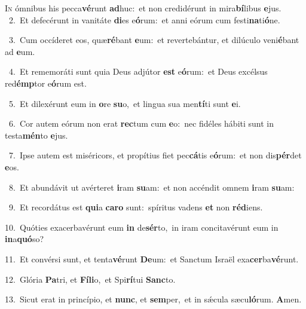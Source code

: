 \lettrine{\initial\textcolor{\initialcolor}{I}}{n} ómnibus his pecca\-\textbf{vé}\-runt \textbf{ad}\-huc:~\star et non credidérunt in mira\-\textbf{bí}\-libus \textbf{e}\-jus.\\
{\numbfont\textcolor{\numbcolor}{~2.}}~Et defecérunt in vanitáte \textbf{di}\-es e\-\textbf{ó}\-rum:~\star et anni eórum cum festi\-\textbf{na}\-ti\-\textbf{ó}\-ne.\par
{\numbfont\textcolor{\numbcolor}{~3.}}~Cum occíderet eos, quæ\-\textbf{ré}\-bant \textbf{e}\-um:~\star et revertebántur, et dilúculo veni\-\textbf{é}\-bant ad \textbf{e}\-um.\par
{\numbfont\textcolor{\numbcolor}{~4.}}~Et rememoráti sunt quia Deus adjútor \textbf{est} e\-\textbf{ó}\-rum:~\star et Deus excélsus red\-\textbf{émp}\-tor e\-\textbf{ó}\-rum est.\par
{\numbfont\textcolor{\numbcolor}{~5.}}~Et dilexérunt eum in \textbf{o}\-re \textbf{su}\-o,~\star et lingua sua men\-\textbf{tí}\-ti sunt \textbf{e}\-i.\par
{\numbfont\textcolor{\numbcolor}{~6.}}~Cor autem eórum non erat \textbf{rec}\-tum cum \textbf{e}\-o:~\star nec fidéles hábiti sunt in testa\-\textbf{mén}\-to \textbf{e}\-jus.\par
{\numbfont\textcolor{\numbcolor}{~7.}}~Ipse autem est miséricors, et propítius fiet pec\-\textbf{cá}\-tis e\-\textbf{ó}\-rum:~\star et non dis\-\textbf{pér}\-det \textbf{e}\-os.\par
{\numbfont\textcolor{\numbcolor}{~8.}}~Et abundávit ut avérteret \textbf{i}\-ram \textbf{su}\-am:~\star et non accéndit omnem \textbf{i}\-ram \textbf{su}\-am:\par
{\numbfont\textcolor{\numbcolor}{~9.}}~Et recordátus est \textbf{qui}\-a \textbf{ca}\-\textbf{ro} sunt:~\star spíritus vadens \textbf{et} non \textbf{réd}\-iens.\par
{\numbfont\textcolor{\numbcolor}{10.}}~Quóties exacerbavérunt eum \textbf{in} de\-\textbf{sér}\-to,~\star in iram concitavérunt eum in \textbf{in}\-a\-\textbf{quó}\-so?\par
{\numbfont\textcolor{\numbcolor}{11.}}~Et convérsi sunt, et tenta\-\textbf{vé}\-runt \textbf{De}\-um:~\star et Sanctum Israël exa\-\textbf{cer}\-ba\-\textbf{vé}\-runt.\par
{\numbfont\textcolor{\numbcolor}{12.}}~Glória \textbf{Pa}\-tri, et \textbf{Fí}\-\textbf{li}o,~\star et Spi\-\textbf{rí}\-tui \textbf{Sanc}\-to.\par
{\numbfont\textcolor{\numbcolor}{13.}}~Sicut erat in princípio, et \textbf{nunc}\-, et \textbf{sem}\-per,~\star et in sǽcula sæcu\-\textbf{ló}\-rum. \textbf{A}\-men.\par
